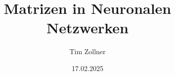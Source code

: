 \documentclass{article}
\begin{document}
\title{Matrizen in Neuronalen Netzwerken}
\author{Tim Zollner}
\date{17.02.2025}
\maketitle

\section{}
\subsection{}
\subsection{}
\section{}
\subsection{}
\subsection{}
\subsubsection{}
\end{document}
